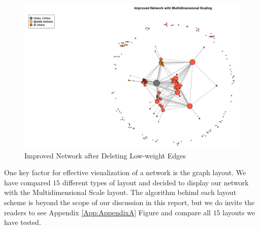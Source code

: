 \documentclass[11pt]{article}
\begin{document}
\begin{figure}[ht]
\centering
\caption{Improved Network after Deleting Low-weight Edges}
\label{fig:improvednw}
\includegraphics[width = 1\textwidth]{report_dms_layout}
\end{figure}

One key factor for effective visualization of a network is the graph layout. We have compared $15$ different types of layout and decided to display our network with the Multidimensional Scale layout. The algorithm behind each layout scheme is beyond the scope of our discussion in this report, but we do invite the readers to see Appendix \ref{App:AppendixA} Figure   and compare all $15$ layouts we have tested.
\end{document}
